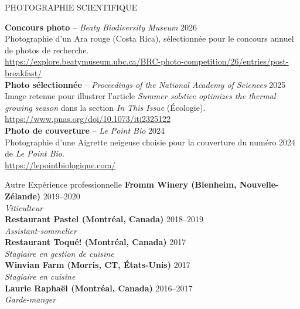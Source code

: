 \documentclass[
	11pt, %
]{resume} %
\begin{document}
\begin{rSection}{PHOTOGRAPHIE SCIENTIFIQUE}
  
  \textbf{Concours photo} – \textit{Beaty Biodiversity Museum} \hfill 2026 \\
  Photographie d’un Ara rouge (Costa Rica), sélectionnée pour le concours annuel de photos de recherche. \\
  \href{https://explore.beatymuseum.ubc.ca/BRC-photo-competition/26/entries/post-breakfast/}{https://explore.beatymuseum.ubc.ca/BRC-photo-competition/26/entries/post-breakfast/} 
  \vspace{1.5ex}\\
  \textbf{Photo sélectionnée} – \textit{Proceedings of the National Academy of Sciences} \hfill 2025 \\
  Image retenue pour illustrer l’article \textit{Summer solstice optimizes the thermal growing season} dans la section \textit{In This Issue} (Écologie).\\
  \href{https://www.pnas.org/doi/10.1073/iti2325122#sec-4}{https://www.pnas.org/doi/10.1073/iti2325122} 
  \vspace{1.5ex}\\
  \textbf{Photo de couverture} – \textit{Le Point Bio} \hfill 2024 \\
  Photographie d’une Aigrette neigeuse choisie pour la couverture du numéro 2024 de \textit{Le Point Bio}.\\
  \href{https://lepointbiologique.com/wp-content/uploads/2024/04/le_point_bio_2024_numerique.pdf}{https://lepointbiologique.com/}\\
\end{rSection}


\begin{rSection}{Autre Expérience professionnelle}
	\textbf{Fromm Winery (Blenheim, Nouvelle-Zélande)} \hfill 2019--2020 \\ 
	\textit{Viticulteur} \\ 
	\textbf{Restaurant Pastel (Montréal, Canada)} \hfill 2018--2019 \\
	\textit{Assistant-sommelier} \\
	\textbf{Restaurant Toqué! (Montréal, Canada)} \hfill 2017 \\
	\textit{Stagiaire en gestion de cuisine} \\
	\textbf{Winvian Farm (Morris, CT, États-Unis)} \hfill 2017 \\
	\textit{Stagiaire en cuisine}\\
	\textbf{Laurie Raphaël (Montréal, Canada)} \hfill 2016--2017 \\
	\textit{Garde-manger}
\end {rSection}
\end{document}
